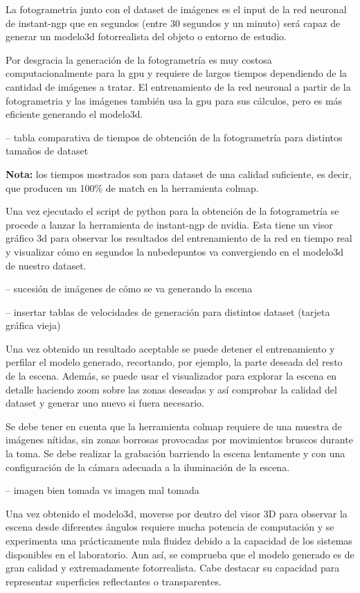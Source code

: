 \documentclass[a4paper, 12pt, spanish, twoside]{article}
\begin{document}
La \gls{fotogrametria} junto con el \gls{dataset} de imágenes es el input de la red neuronal de \gls{instant-ngp} que en segundos (entre 30 segundos y un minuto) será capaz de generar un \gls{modelo3d} fotorrealista del objeto o entorno de estudio. 

Por desgracia la generación de la fotogrametría es muy costosa computacionalmente para la \acrshort{gpu} y requiere de largos tiempos dependiendo de la cantidad de imágenes a tratar. El entrenamiento de la red neuronal a partir de la \gls{fotogrametria} y las imágenes también usa la \acrshort{gpu} para sus cálculos, pero es más eficiente generando el \gls{modelo3d}.  

-- tabla comparativa de tiempos de obtención de la fotogrametría para distintos tamaños de dataset 

\textbf{Nota:} los tiempos mostrados son para \gls{dataset} de una calidad suficiente, es decir, que producen un 100\% de match en la herramienta \gls{colmap}. 

Una vez ejecutado el script de \gls{python} para la obtención de la fotogrametría se procede a lanzar la herramienta de \gls{instant-ngp} de \gls{nvidia}. Esta tiene un visor gráfico \acrshort{3d} para observar los resultados del entrenamiento de la red en tiempo real y visualizar cómo en segundos la \gls{nubedepuntos} va convergiendo en el \gls{modelo3d} de nuestro \gls{dataset}.  

-- sucesión de imágenes de cómo se va generando la escena 

-- insertar tablas de velocidades de generación para distintos dataset (tarjeta gráfica vieja) 

Una vez obtenido un resultado aceptable se puede detener el entrenamiento y perfilar el modelo generado, recortando, por ejemplo, la parte deseada del resto de la escena. Además, se puede usar el visualizador para explorar la escena en detalle haciendo zoom sobre las zonas deseadas y así comprobar la calidad del \gls{dataset} y generar uno nuevo si fuera necesario. 

Se debe tener en cuenta que la herramienta \gls{colmap} requiere de una muestra de imágenes nítidas, sin zonas borrosas provocadas por movimientos bruscos durante la toma. Se debe realizar la grabación barriendo la escena lentamente y con una configuración de la cámara adecuada a la iluminación de la escena. 

-- imagen bien tomada vs imagen mal tomada 

Una vez obtenido el \gls{modelo3d}, moverse por dentro del visor 3D para observar la escena desde diferentes ángulos requiere mucha potencia de computación y se experimenta una prácticamente nula fluidez debido a la capacidad de los sistemas disponibles en el laboratorio. Aun así, se comprueba que el modelo generado es de gran calidad y extremadamente fotorrealista. Cabe destacar su capacidad para representar superficies reflectantes o transparentes. 
\end{document}
